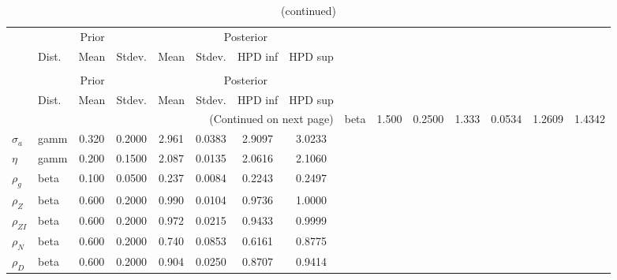 
\begin{center}
\begin{longtable}{llcccccc} 
\caption{Results from Metropolis-Hastings (parameters)}
 \label{Table:MHPosterior:1}\\
\toprule 
  & \multicolumn{3}{c}{Prior}  &  \multicolumn{4}{c}{Posterior} \\
  \cmidrule(r{.75em}){2-4} \cmidrule(r{.75em}){5-8}
  & Dist. & Mean  & Stdev. & Mean & Stdev. & HPD inf & HPD sup\\
\midrule \endfirsthead 
\caption{(continued)}\\\toprule 
  & \multicolumn{3}{c}{Prior}  &  \multicolumn{4}{c}{Posterior} \\
  \cmidrule(r{.75em}){2-4} \cmidrule(r{.75em}){5-8}
  & Dist. & Mean  & Stdev. & Mean & Stdev. & HPD inf & HPD sup\\
\midrule \endhead 
\bottomrule \multicolumn{8}{r}{(Continued on next page)} \endfoot 
\bottomrule \endlastfoot 
${\gamma}$ & beta &   1.500 & 0.2500 &   1.333& 0.0534 &  1.2609 &  1.4342 \\ 
${\sigma_a}$ & gamm &   0.320 & 0.2000 &   2.961& 0.0383 &  2.9097 &  3.0233 \\ 
${\eta}$ & gamm &   0.200 & 0.1500 &   2.087& 0.0135 &  2.0616 &  2.1060 \\ 
${\rho_g}$ & beta &   0.100 & 0.0500 &   0.237& 0.0084 &  0.2243 &  0.2497 \\ 
${\rho_Z}$ & beta &   0.600 & 0.2000 &   0.990& 0.0104 &  0.9736 &  1.0000 \\ 
${\rho_{ZI}}$ & beta &   0.600 & 0.2000 &   0.972& 0.0215 &  0.9433 &  0.9999 \\ 
${\rho_N}$ & beta &   0.600 & 0.2000 &   0.740& 0.0853 &  0.6161 &  0.8775 \\ 
${\rho_D}$ & beta &   0.600 & 0.2000 &   0.904& 0.0250 &  0.8707 &  0.9414 \\ 
\end{longtable}
 \end{center}
